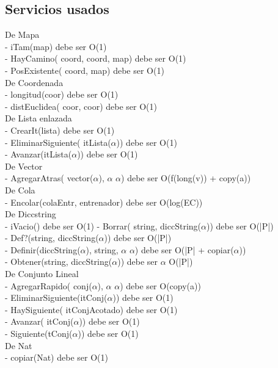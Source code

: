 \subsection{Servicios usados} 

De Mapa \\
 - iTam(map) debe ser O(1) \\
 - HayCamino( coord, coord, map) debe ser  O(1) \\
 - PosExistente( coord,  map)  debe ser O(1) \\

De Coordenada \\
 - longitud(coor) debe ser O(1) \\
 - distEuclidea( coor, coor)  debe ser O(1) \\
 

De Lista enlazada \\
 - CrearIt(lista) debe ser O(1) \\
 - EliminarSiguiente( itLista($\alpha$)) debe ser O(1) \\
 - Avanzar(itLista($\alpha$)) debe ser O(1) \\

De Vector \\
 - AgregarAtras( vector($\alpha$), $\alpha$ $\alpha$) debe ser O(f(long(v)) + copy(a))\\

De Cola \\
 - Encolar(colaEntr, entrenador) debe ser O(log(EC)) \\

De Diccstring \\
 - iVacio() debe ser O(1)
 - Borrar( string, diccString($\alpha$)) debe ser O(|P|) \\
 - Def?(string,  diccString($\alpha$)) debe ser O(|P|) \\
 - Definir(diccString($\alpha$), string, $\alpha$ $\alpha$) debe ser O(|P| + copiar($\alpha$)) \\
 - Obtener(string, diccString($\alpha$)) debe ser $\alpha$ O(|P|) \\

De Conjunto Lineal \\
 - AgregarRapido( conj($\alpha$), $\alpha$ $\alpha$) debe ser O(copy(a)) \\
 - EliminarSiguiente(itConj($\alpha$)) debe ser O(1) \\
 - HaySiguiente( itConjAcotado) debe ser O(1) \\
 - Avanzar( itConj($\alpha$)) debe ser O(1) \\
 - Siguiente(tConj($\alpha$)) debe ser O(1) \\

De Nat \\
 - copiar(Nat) debe ser O(1) \\ 
 